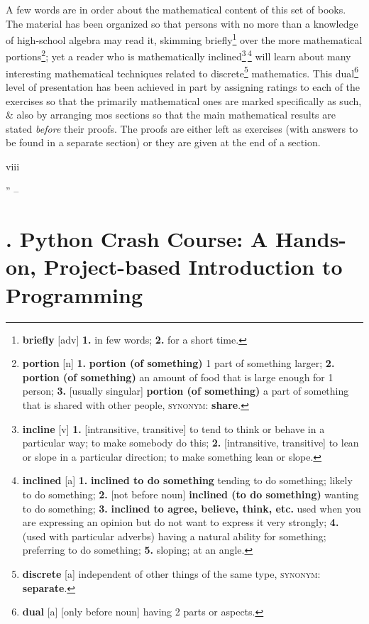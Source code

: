 \documentclass[oneside]{book}
\numberwithin{equation}{section}
\begin{document}
A few words are in order about the mathematical content of this set of books. The material has been organized so that persons with no more than a knowledge of high-school algebra may read it, skimming briefly\footnote{\textbf{briefly} [adv] \textbf{1.} in few words; \textbf{2.} for a short time.} over the more mathematical portions\footnote{\textbf{portion} [n] \textbf{1.} \textbf{portion (of something)} 1 part of something larger; \textbf{2.} \textbf{portion (of something)} an amount of food that is large enough for 1 person; \textbf{3.} [usually singular] \textbf{portion (of something)} a part of something that is shared with other people, \textsc{synonym}: \textbf{share}.}; yet a reader who is mathematically inclined\footnote{\textbf{incline} [v] \textbf{1.} [intransitive, transitive] to tend to think or behave in a particular way; to make somebody do this; \textbf{2.} [intransitive, transitive] to lean or slope in a particular direction; to make something lean or slope.}\,\footnote{\textbf{inclined} [a] \textbf{1.} \textbf{inclined to do something} tending to do something; likely to do something; \textbf{2.} [not before noun] \textbf{inclined (to do something)} wanting to do something; \textbf{3.} \textbf{inclined to agree, believe, think, etc.} used when you are expressing an opinion but do not want to express it very strongly; \textbf{4.} (used with particular adverbs) having a natural ability for something; preferring to do something; \textbf{5.} sloping; at an angle.} will learn about many interesting mathematical techniques related to discrete\footnote{\textbf{discrete} [a] independent of other things of the same type, \textsc{synonym}: \textbf{separate}.} mathematics. This dual\footnote{\textbf{dual} [a] [only before noun] having 2 parts or aspects.} level of presentation has been achieved in part by assigning ratings to each of the exercises so that the primarily mathematical ones are marked specifically as such, \& also by arranging mos sections so that the main mathematical results are stated \textit{before} their proofs. The proofs are either left as exercises (with answers to be found in a separate section) or they are given at the end of a section.

viii

'' -- \cite[Preface, pp. v--]{Knuth1997}


\chapter{\cite{Matthes2019}. Python Crash Course: A Hands-on, Project-based Introduction to Programming}
\end{document}
